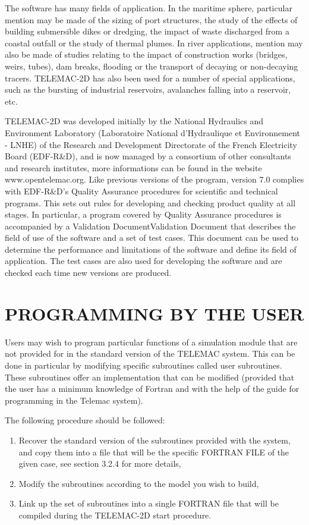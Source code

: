  The software has many fields of application. In the maritime sphere, particular mention may be made of the sizing of port structures, the study of the effects of building submersible dikes or dredging, the impact of waste discharged from a coastal outfall or the study of thermal plumes. In river applications, mention may also be made of studies relating to the impact of construction works (bridges, weirs, tubes), dam breaks, flooding or the transport of decaying or non-decaying tracers. TELEMAC-2D has also been used for a number of special applications, such as the bursting of industrial reservoirs, avalanches falling into a reservoir, etc.

 TELEMAC-2D was developed initially by the National Hydraulics and Environment Laboratory (Laboratoire National d'Hydraulique et Environnement - LNHE) of the Research and Development Directorate of the French Electricity Board (EDF-R\&D), and is now managed by a consortium of other consultants and research institutes, more informations can be found in the website www.opentelemac.org. Like previous versions of the program, version 7.0 complies with EDF-R\&D's Quality Assurance procedures for scientific and technical programs. This sets out rules for developing and checking product quality at all stages. In particular, a program covered by Quality Assurance procedures is accompanied by a Validation DocumentValidation Document  that describes the field of use of the software and a set of test cases. This document can be used to determine the performance and limitations of the software and define its field of application. The test cases are also used for developing the software and are checked each time new versions are produced.


\section{  PROGRAMMING BY THE USER}

 Users may wish to program particular functions of a simulation module that are not provided for in the standard version of the TELEMAC system. This can be done in particular by modifying specific subroutines called user subroutines. These subroutines offer an implementation that can be modified (provided that the user has a minimum knowledge of Fortran and with the help of the guide for programming in the Telemac system).

 The following procedure should be followed:

\begin{enumerate}
\item  Recover the standard version of the subroutines provided with the system, and copy them into a file that will be the specific FORTRAN FILE of the given case, see section 3.2.4 for more details,

\item  Modify the subroutines according to the model you wish to build,

\item  Link up the set of subroutines into a single FORTRAN file that will be compiled during the TELEMAC-2D start procedure.
\end{enumerate}

